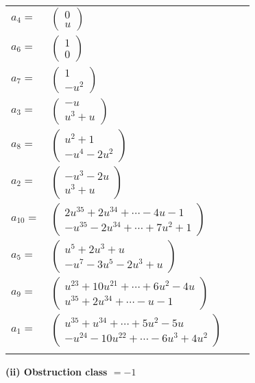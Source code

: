 \documentclass[1p]{elsarticle_modified}
\theoremstyle{definition}
\begin{document}
\begin{tabular}{m{7pt} m{180pt} m{7pt} m{180pt} }
\flushright $a_{4}=$&$\begin{pmatrix}0\\u\end{pmatrix}$ \\
\flushright $a_{6}=$&$\begin{pmatrix}1\\0\end{pmatrix}$ \\
\flushright $a_{7}=$&$\begin{pmatrix}1\\- u^2\end{pmatrix}$ \\
\flushright $a_{3}=$&$\begin{pmatrix}- u\\u^3+u\end{pmatrix}$ \\
\flushright $a_{8}=$&$\begin{pmatrix}u^2+1\\- u^4-2 u^2\end{pmatrix}$ \\
\flushright $a_{2}=$&$\begin{pmatrix}- u^3-2 u\\u^3+u\end{pmatrix}$ \\
\flushright $a_{10}=$&$\begin{pmatrix}2 u^{35}+2 u^{34}+\cdots-4 u-1\\- u^{35}-2 u^{34}+\cdots+7 u^2+1\end{pmatrix}$ \\
\flushright $a_{5}=$&$\begin{pmatrix}u^5+2 u^3+u\\- u^7-3 u^5-2 u^3+u\end{pmatrix}$ \\
\flushright $a_{9}=$&$\begin{pmatrix}u^{23}+10 u^{21}+\cdots+6 u^2-4 u\\u^{35}+2 u^{34}+\cdots- u-1\end{pmatrix}$ \\
\flushright $a_{1}=$&$\begin{pmatrix}u^{35}+u^{34}+\cdots+5 u^2-5 u\\- u^{24}-10 u^{22}+\cdots-6 u^3+4 u^2\end{pmatrix}$\\&\end{tabular}
\flushleft \textbf{(ii) Obstruction class $= -1$}\\~\\
\end{document}

